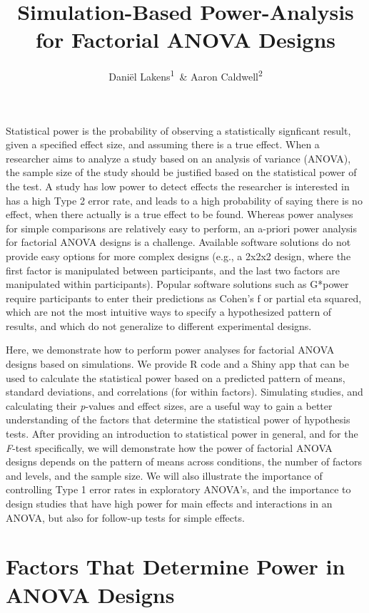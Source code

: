 \documentclass[,man,floatsintext]{apa6}
\title{Simulation-Based Power-Analysis for Factorial ANOVA Designs}
\author{Daniël Lakens\textsuperscript{1}~\& Aaron Caldwell\textsuperscript{2}}
\date{}
\affiliation{
\vspace{0.5cm}
\textsuperscript{1} Eindhoven University of Technology, The Netherlands\\\textsuperscript{2} Department of Health, Human Performance and Recreation, University of Arkansas, USA}
\begin{document}
\maketitle

Statistical power is the probability of observing a statistically
signficant result, given a specified effect size, and assuming there is
a true effect. When a researcher aims to analyze a study based on an
analysis of variance (ANOVA), the sample size of the study should be
justified based on the statistical power of the test. A study has low
power to detect effects the researcher is interested in has a high Type
2 error rate, and leads to a high probability of saying there is no
effect, when there actually is a true effect to be found. Whereas power
analyses for simple comparisons are relatively easy to perform, an
a-priori power analysis for factorial ANOVA designs is a challenge.
Available software solutions do not provide easy options for more
complex designs (e.g., a 2x2x2 design, where the first factor is
manipulated between participants, and the last two factors are
manipulated within participants). Popular software solutions such as
G*power require participants to enter their predictions as Cohen's f or
partial eta squared, which are not the most intuitive ways to specify a
hypothesized pattern of results, and which do not generalize to
different experimental designs.

Here, we demonstrate how to perform power analyses for factorial ANOVA
designs based on simulations. We provide R code and a Shiny app that can
be used to calculate the statistical power based on a predicted pattern
of means, standard deviations, and correlations (for within factors).
Simulating studies, and calculating their \emph{p}-values and effect
sizes, are a useful way to gain a better understanding of the factors
that determine the statistical power of hypothesis tests. After
providing an introduction to statistical power in general, and for the
\emph{F}-test specifically, we will demonstrate how the power of
factorial ANOVA designs depends on the pattern of means across
conditions, the number of factors and levels, and the sample size. We
will also illustrate the importance of controlling Type 1 error rates in
exploratory ANOVA's, and the importance to design studies that have high
power for main effects and interactions in an ANOVA, but also for
follow-up tests for simple effects.

\section{Factors That Determine Power in ANOVA
Designs}\label{factors-that-determine-power-in-anova-designs}
\end{document}
